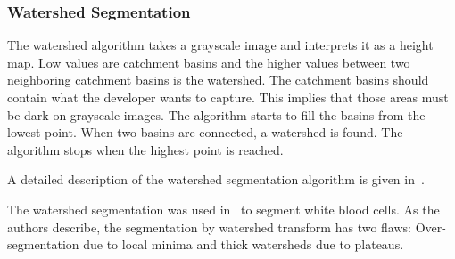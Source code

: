 \subsubsection{Watershed Segmentation}\label{subsec:watershed}
The watershed algorithm takes a grayscale image and interprets it as a height
map. Low values are catchment basins and the higher values between two
neighboring catchment basins is the watershed. The catchment basins should
contain what the developer wants to capture. This implies that those areas
must be dark on grayscale images. The algorithm starts to fill the basins from
the lowest point. When two basins are connected, a watershed is found. The
algorithm stops when the highest point is reached.

A detailed description of the watershed segmentation algorithm is given
in~\cite{roerdink2000watershed}.

The watershed segmentation was used in~\cite{1260033} to segment white blood
cells. As the authors describe, the segmentation by watershed transform has
two flaws: Over-segmentation due to local minima and thick watersheds due to
plateaus.
